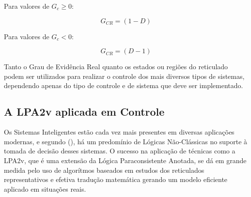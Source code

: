 Para valores de $G_c \geq 0$: 

\begin{center}
\begin{equation}
G_{CR} = (1-D)
\end{equation}
\end{center}

Para valores de $G_c < 0$:

\begin{center}
\begin{equation}
G_{CR} = (D-1)
\end{equation}
\end{center}


Tanto o Grau de Evidência Real quanto os estados ou regiões do reticulado 
podem ser utilizados para realizar o controle dos mais diversos tipos de sistemas, 
dependendo apenas do tipo de controle e de sistema que deve ser implementado. 

\subsection{A LPA2v aplicada em Controle}





























Os Sistemas Inteligentes estão cada vez mais presentes 
em diversas aplicações modernas, 
e segundo \citeauthor{JISF2011}(\citeyear{JISF2011}), 
há um predomínio de Lógicas Não-Clássicas no suporte à tomada de decisão desses sistemas. 
O sucesso na aplicação de técnicas como a LPA2v, 
que é uma extensão da Lógica Paraconsistente Anotada, 
se dá em grande medida pelo uso de 
algorítmos baseados em estudos dos reticulados representativos e 
efetiva tradução matemática 
gerando um modelo eficiente aplicado em situações reais.

